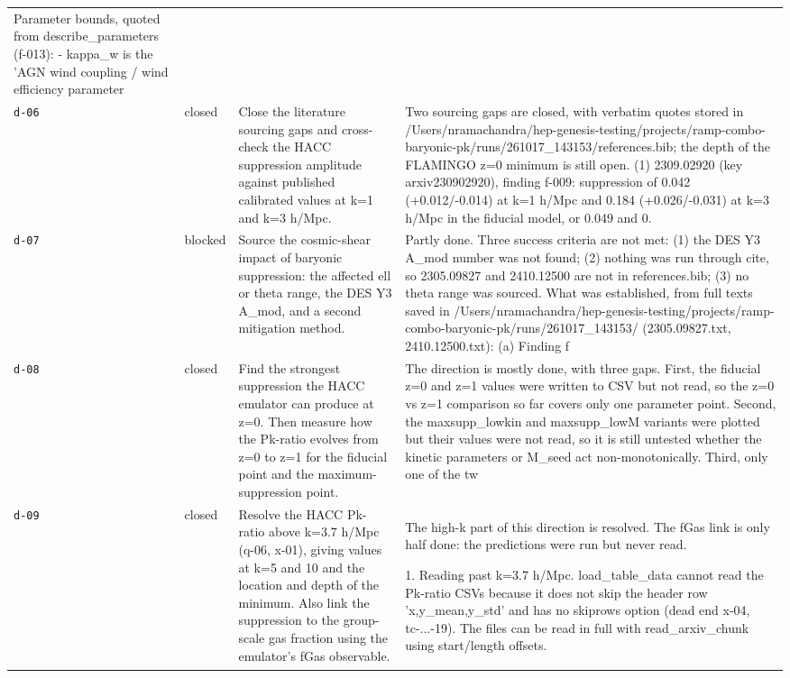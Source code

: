 \documentclass[11pt,a4paper]{article}
\begin{document}
\begin{longtable}{@{}p{}p{}p{}p{}@{}}
Parameter bounds, quoted from describe\_parameters (f-013):
- kappa\_w is the 'AGN wind coupling / wind efficiency parameter \\
\texttt{d-06} & closed & Close the literature sourcing gaps and cross-check the HACC suppression amplitude against published calibrated values at k=1 and k=3 h/Mpc. & Two sourcing gaps are closed, with verbatim quotes stored in /Users/nramachandra/hep-genesis-testing/projects/ramp-combo-baryonic-pk/runs/261017\_143153/references.bib; the depth of the FLAMINGO z=0 minimum is still open. (1) 2309.02920 (key arxiv230902920), finding f-009: suppression of 0.042 (+0.012/-0.014) at k=1 h/Mpc and 0.184 (+0.026/-0.031) at k=3 h/Mpc in the fiducial model, or 0.049 and 0. \\
\texttt{d-07} & blocked & Source the cosmic-shear impact of baryonic suppression: the affected ell or theta range, the DES Y3 A\_mod, and a second mitigation method. & Partly done. Three success criteria are not met: (1) the DES Y3 A\_mod number was not found; (2) nothing was run through cite, so 2305.09827 and 2410.12500 are not in references.bib; (3) no theta range was sourced. What was established, from full texts saved in /Users/nramachandra/hep-genesis-testing/projects/ramp-combo-baryonic-pk/runs/261017\_143153/ (2305.09827.txt, 2410.12500.txt): (a) Finding f \\
\texttt{d-08} & closed & Find the strongest suppression the HACC emulator can produce at z=0. Then measure how the Pk-ratio evolves from z=0 to z=1 for the fiducial point and the maximum-suppression point. & The direction is mostly done, with three gaps. First, the fiducial z=0 and z=1 values were written to CSV but not read, so the z=0 vs z=1 comparison so far covers only one parameter point. Second, the maxsupp\_lowkin and maxsupp\_lowM variants were plotted but their values were not read, so it is still untested whether the kinetic parameters or M\_seed act non-monotonically. Third, only one of the tw \\
\texttt{d-09} & closed & Resolve the HACC Pk-ratio above k=3.7 h/Mpc (q-06, x-01), giving values at k=5 and 10 and the location and depth of the minimum. Also link the suppression to the group-scale gas fraction using the emulator's fGas observable. & The high-k part of this direction is resolved. The fGas link is only half done: the predictions were run but never read.

1. Reading past k=3.7 h/Mpc. load\_table\_data cannot read the Pk-ratio CSVs because it does not skip the header row 'x,y\_mean,y\_std' and has no skiprows option (dead end x-04, tc-...-19). The files can be read in full with read\_arxiv\_chunk using start/length offsets.


\end{longtable}
\end{document}

